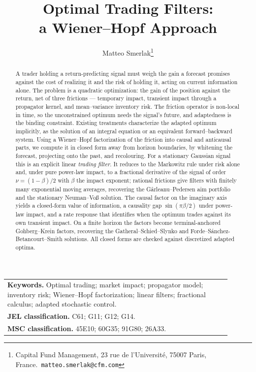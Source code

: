 \documentclass[11pt]{article}
\title{Optimal Trading Filters:\\ a Wiener--Hopf Approach}
\author{Matteo Smerlak\thanks{Capital Fund Management, 23 rue de l'Universit\'e, 75007 Paris, France.\ \texttt{matteo.smerlak@cfm.com}}}
\date{}
\theoremstyle{plain}
\theoremstyle{definition}
\theoremstyle{remark}
\begin{document}
\maketitle

\begin{center}
\begin{tabular}{p{0.9\linewidth}}
\textbf{Keywords.} Optimal trading; market impact; propagator model; inventory risk; Wiener--Hopf factorization; linear filters; fractional calculus; adapted stochastic control.\\[2pt]
\textbf{JEL classification.} C61; G11; G12; G14.\\[2pt]
\textbf{MSC classification.} 45E10; 60G35; 91G80; 26A33.
\end{tabular}
\end{center}

\begin{abstract}
A trader holding a return-predicting signal must weigh the gain a forecast promises against the cost of realizing it and the risk of holding it, acting on current information alone. The problem is a quadratic optimization: the gain of the position against the return, net of three frictions --- temporary impact, transient impact through a propagator kernel, and mean--variance inventory risk. The friction operator is non-local in time, so the unconstrained optimum needs the signal's future, and adaptedness is the binding constraint. Existing treatments characterize the adapted optimum implicitly, as the solution of an integral equation or an equivalent forward--backward system. Using a Wiener--Hopf factorization of the friction into causal and anticausal parts, we compute it in closed form away from horizon boundaries, by whitening the forecast, projecting onto the past, and recolouring. For a stationary Gaussian signal this is an explicit linear \emph{trading filter}. It reduces to the Markowitz rule under risk alone and, under pure power-law impact, to a fractional derivative of the signal of order $\nu=(1-\beta)/2$ with $\beta$ the impact exponent; rational frictions give filters with finitely many exponential moving averages, recovering the G\^arleanu--Pedersen aim portfolio and the stationary Neuman--Vo\ss{} solution. The causal factor on the imaginary axis yields a closed-form value of information, a causality gap $\sin(\pi\beta/2)$ under power-law impact, and a rate response that identifies when the optimum trades against its own transient impact. On a finite horizon the factors become terminal-anchored Gohberg--Krein factors, recovering the Gatheral--Schied--Slynko and Forde--S\'anchez-Betancourt--Smith solutions. All closed forms are checked against discretized adapted optima.
\end{abstract}
\end{document}
